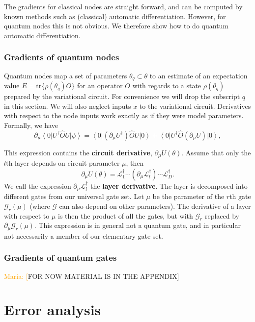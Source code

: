 \documentclass[aps,pra,10pt,twocolumn,groupedaddress,nofootinbib]{revtex4-1}
\theoremstyle{plain}
\newcommand{\ket}[1]{\ensuremath{\left| #1 \right \rangle}}
\newcommand{\bra}[1]{\ensuremath{\left \langle #1 \right |}}
\newcommand{\G}{\mathcal{G}}
\newcommand{\maria}[1]{\textcolor{orange}{Maria: #1}}
\begin{document}
The gradients for classical nodes are straight forward, and can be computed by known methods such as (classical) automatic differentiation. However, for quantum nodes this is not obvious. We therefore show how to do quantum automatic differentiation.

\subsubsection{Gradients of quantum nodes}

Quantum nodes map a set of parameters  $\theta_q \subset \theta$ to an estimate of an expectation value $E = \mathrm{tr}\{ \rho(\theta_q ) O\}$ for an operator $O$ with regards to a state $\rho(\theta_q)$ prepared by the variational circuit. For convenience we will drop the subscript $q$ in this section. We will also neglect inputs $x$ to the variational circuit. Derivatives with respect to the node inputs work exactly as if they were model parameters.\\

Formally, we have
\[ \partial_{\mu} \bra{0}U^{\dagger} \hat{O} U \ket{\psi} =  \bra{0}(\partial_{\mu}U^{\dagger}) \hat{O} U \ket{0} + \bra{0}U^{\dagger} \hat{O} (\partial_{\mu} U) \ket{0}, \]

This expression contains the \textbf{circuit derivative},
$\partial_{\mu}  U(\theta)$. Assume that only the $l$th layer depends
on circuit parameter $\mu$, then
\[
\partial_{\mu}  U(\theta) =  \mathcal{L}_1^{\dagger} \cdots (\partial_{\mu} \mathcal{L}_l^{\dagger})\cdots \mathcal{L}_D^{\dagger}.
\]
We call the expression $\partial_{\mu} \mathcal{L}_l^{\dagger}$  the
\textbf{layer derivative}. The layer is decomposed into different
gates from our universal gate set. Let $\mu$ be the parameter of the
$r$th gate $\G_r(\mu)$ (where $\G$ can also depend on other
parameters). The derivative of a layer with respect to $\mu$ is then the product of all the gates, but with $\G_r$ replaced by $\partial_{\mu} \G_r(\mu)$.
This expression
is in general not a quantum gate, and in particular not necessarily a
member of our elementary gate set.

\subsubsection{Gradients of quantum gates}

\maria[FOR NOW MATERIAL IS IN THE APPENDIX]


\section{Error analysis}
\end{document}
